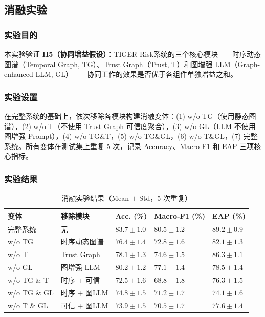 \documentclass[12pt,a4paper]{article}
\newcommand{\projectshort}{TIGER-Risk}
\begin{document}
\subsection{消融实验}
\label{sec:exp-ablation}

\subsubsection{实验目的}

本实验验证 \textbf{H5（协同增益假设）}：\projectshort 系统的三个核心模块——时序动态图谱（Temporal Graph, TG）、Trust Graph（Trust, T）和图增强 LLM（Graph-enhanced LLM, GL）——协同工作的效果是否优于各组件单独增益之和。

\subsubsection{实验设置}

在完整系统的基础上，依次移除各模块构建消融变体：(1) w/o TG（使用静态图谱），(2) w/o T（不使用 Trust Graph 可信度聚合），(3) w/o GL（LLM 不使用图增强 Prompt），(4) w/o TG\&T，(5) w/o TG\&GL，(6) w/o T\&GL，(7) 完整系统。所有变体在测试集上重复 5 次，记录 Accuracy、Macro-F1 和 EAP 三项核心指标。

\subsubsection{实验结果}

\begin{table}[H]
\centering
\footnotesize
\caption{消融实验结果（Mean $\pm$ Std，5 次重复）}
\label{tab:exp-ablation}
\begin{tabularx}{0.95\linewidth}{>{\raggedright\arraybackslash}p{2.0cm} p{2.0cm} >{\centering\arraybackslash}X >{\centering\arraybackslash}X >{\centering\arraybackslash}X}
\toprule
\textbf{变体} & \textbf{移除模块} & \textbf{Acc. (\%)} & \textbf{Macro-F1 (\%)} & \textbf{EAP (\%)} \\
\midrule
完整系统 & 无 & $\mathbf{83.7 \pm 1.0}$ & $\mathbf{80.5 \pm 1.2}$ & $\mathbf{89.2 \pm 0.9}$ \\
w/o TG & 时序动态图谱 & $76.4 \pm 1.4$ & $72.8 \pm 1.6$ & $82.1 \pm 1.3$ \\
w/o T & Trust Graph & $78.1 \pm 1.3$ & $74.6 \pm 1.5$ & $86.3 \pm 1.1$ \\
w/o GL & 图增强 LLM & $80.2 \pm 1.2$ & $77.1 \pm 1.4$ & $78.5 \pm 1.4$ \\
w/o TG \& T & 时序 + 可信 & $72.5 \pm 1.6$ & $68.8 \pm 1.8$ & $76.3 \pm 1.5$ \\
w/o TG \& GL & 时序 + 图LLM & $74.8 \pm 1.5$ & $71.2 \pm 1.7$ & $74.1 \pm 1.6$ \\
w/o T \& GL & 可信 + 图LLM & $73.9 \pm 1.5$ & $70.5 \pm 1.7$ & $77.6 \pm 1.4$ \\
\bottomrule
\end{tabularx}
\end{table}
\end{document}
